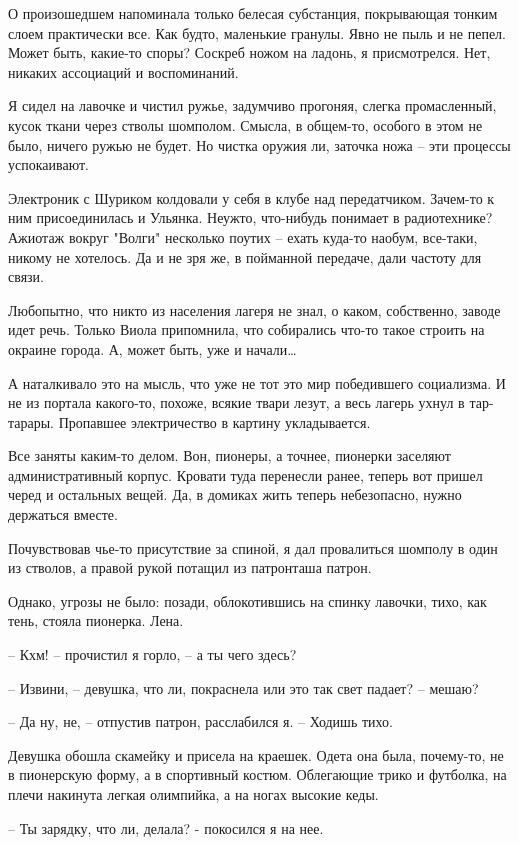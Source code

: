 \documentclass[a4paper]{book}
\begin{document}
О произошедшем напоминала только белесая субстанция, покрывающая тонким слоем практически все. Как будто, маленькие гранулы. Явно не пыль и не пепел. Может быть, какие-то споры? Соскреб ножом на ладонь, я присмотрелся. Нет, никаких ассоциаций и воспоминаний.

Я сидел на лавочке и чистил ружье, задумчиво прогоняя, слегка промасленный, кусок ткани через стволы шомполом. Смысла, в общем-то, особого в этом не было, ничего ружью не будет. Но чистка оружия ли, заточка ножа -- эти процессы успокаивают. 

Электроник с Шуриком колдовали у себя в клубе над передатчиком. Зачем-то к ним присоединилась и Ульянка. Неужто, что-нибудь понимает в радиотехнике? Ажиотаж вокруг "Волги" несколько поутих -- ехать куда-то наобум, все-таки, никому не хотелось. Да и не зря же, в пойманной передаче, дали частоту для связи. 

Любопытно, что никто из населения лагеря не знал, о каком, собственно, заводе идет речь. Только Виола припомнила, что собирались что-то такое строить на окраине города. А, может быть, уже и начали\ldots

А наталкивало это на мысль, что уже не тот это мир победившего социализма. И не из портала какого-то, похоже, всякие твари лезут, а весь лагерь ухнул в тар-тарары. Пропавшее электричество в картину укладывается.

Все заняты каким-то делом. Вон, пионеры, а точнее, пионерки заселяют административный корпус. Кровати туда перенесли ранее, теперь вот пришел черед и остальных вещей. Да, в домиках жить теперь небезопасно, нужно держаться вместе.

Почувствовав чье-то присутствие за спиной, я дал провалиться шомполу в один из стволов, а правой рукой потащил из патронташа патрон. 

Однако, угрозы не было: позади, облокотившись на спинку лавочки, тихо, как тень, стояла пионерка. Лена. 

-- Кхм! -- прочистил я горло, -- а ты чего здесь?

-- Извини, -- девушка, что ли, покраснела или это так свет падает? -- мешаю?

-- Да ну, не, -- отпустив патрон, расслабился я. -- Ходишь тихо.  

Девушка обошла скамейку и присела на краешек. Одета она была, почему-то, не в пионерскую форму, а в спортивный костюм. Облегающие трико и футболка, на плечи накинута легкая олимпийка, а на ногах высокие кеды.

-- Ты зарядку, что ли, делала? - покосился я на нее. 
\end{document}
